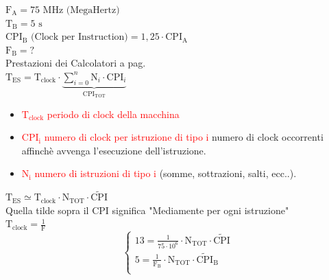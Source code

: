 $ \text{F}_\text{A} = 75 \text{ MHz (MegaHertz)} $ \\

$ \text{T}_\text{B} = 5 \text{ s} $ \\

$ \text{CPI}_\text{B} \text{ (Clock per Instruction)} = 1,25 \cdot \text{CPI}_\text{A} $ \\

$ \text{F}_\text{B} = ? $ \\

\textsf{{\large Prestazioni dei Calcolatori a pag.\pageref{fig:prestazione}}} \\

$ \text{T}_\text{ES} = \text{T}_\text{clock} \cdot \underbrace{\sum_{i = 0}^{n} \text{N}_i \cdot \text{CPI}_i} _{\text{CPI}_\text{TOT}} $ \\

\begin{itemize}
\item\textsf{{\small \textcolor{red}{$\text{T}_\text{clock}$ periodo di clock della macchina} }} \\
\item\textsf{{\small \textcolor{red}{$\text{CPI}_\text{i}$ numero di clock per istruzione di tipo i} numero di clock occorrenti affinchè avvenga l'esecuzione dell'istruzione.}} \\
\item\textsf{{\small \textcolor{red}{$\text{N}_\text{i}$ numero di istruzioni di tipo i} (somme, sottrazioni, salti, ecc..).}} \\
\end{itemize}

\pagebreak

$ \text{T}_\text{ES} \simeq \text{T}_\text{clock} \cdot \text{N}_\text{TOT} \cdot \widetilde{\text{CPI}}  $ \\

\textsf{{\small Quella tilde sopra il CPI significa "Mediamente per ogni istruzione"}} \\

$ \text{T}_\text{clock} = \frac{1}{\text{F}} $ \\

\begin{equation*}
\begin{cases}
13 = \frac{1}{75 \cdot 10^6} \cdot \text{N}_\text{TOT} \cdot\widetilde{\text{CPI}} \\
5 = \frac{1}{\text{F}_\text{B}} \cdot \text{N}_\text{TOT} \cdot \widetilde{\text{CPI}}_\text{B} \\
\end{cases}
\end{equation*}

